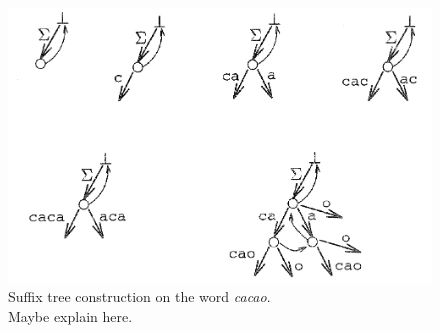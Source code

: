 
\begin{center}
	\begin{figure}
		\centering
		\includegraphics[width=0.9\linewidth]{figures/cacao}
		\caption[Suffix tree construction on the word \textit{cacao}]{Suffix tree construction on the word \textit{cacao}. \\Maybe explain here. }
		\label{fig:cacao}
	\end{figure}
\end{center}